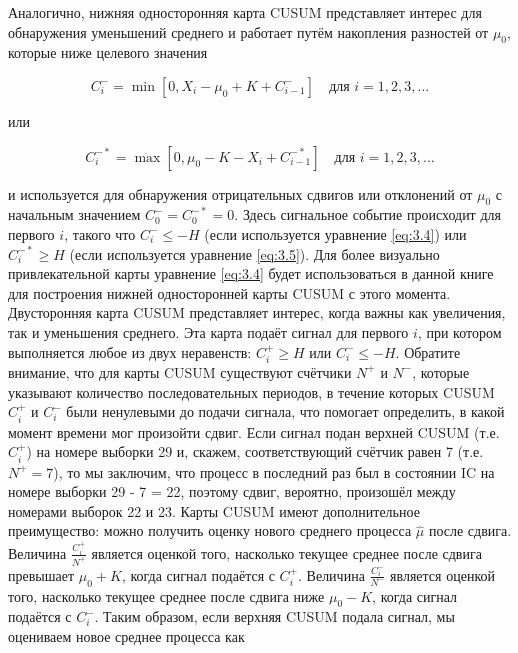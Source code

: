 Аналогично, нижняя односторонняя карта CUSUM представляет интерес для обнаружения уменьшений среднего и работает путём накопления разностей от \(\mu_0\), которые ниже целевого значения

\begin{equation}
	C_i^{-} = \min[0, X_i - \mu_0 + K + C_{i-1}^{-}] \quad \text{для } i = 1, 2, 3, \ldots
	\label{eq:3.4}
\end{equation}

или

\begin{equation}
	C_i^{-*} = \max[0, \mu_0 - K - X_i + C_{i-1}^{-*}] \quad \text{для } i = 1, 2, 3, \ldots
	\label{eq:3.5}
\end{equation}

и используется для обнаружения отрицательных сдвигов или отклонений от \(\mu_0\) с начальным значением \(C_0^- = C_0^{-*} = 0\). Здесь сигнальное событие происходит для первого \(i\), такого что \(C_i^- \leq -H\) (если используется уравнение \eqref{eq:3.4}) или \(C_i^{-*} \geq H\) (если используется уравнение \eqref{eq:3.5}). Для более визуально привлекательной карты уравнение \eqref{eq:3.4} будет использоваться в данной книге для построения нижней односторонней карты CUSUM с этого момента. Двусторонняя карта CUSUM представляет интерес, когда важны как увеличения, так и уменьшения среднего. Эта карта подаёт сигнал для первого \(i\), при котором выполняется любое из двух неравенств: \(C_i^+ \geq H\) или \(C_i^- \leq -H\). Обратите внимание, что для карты CUSUM существуют счётчики \(N^+\) и \(N^-\), которые указывают количество последовательных периодов, в течение которых CUSUM \(C_i^+\) и \(C_i^-\) были ненулевыми до подачи сигнала, что помогает определить, в какой момент времени мог произойти сдвиг. Если сигнал подан верхней CUSUM (т.е. \(C_i^+\)) на номере выборки 29 и, скажем, соответствующий счётчик равен 7 (т.е. \(N^+ = 7\)), то мы заключим, что процесс в последний раз был в состоянии IC на номере выборки 29 - 7 = 22, поэтому сдвиг, вероятно, произошёл между номерами выборок 22 и 23. Карты CUSUM имеют дополнительное преимущество: можно получить оценку нового среднего процесса \(\hat{\mu}\) после сдвига. Величина \(\frac{C_i^+}{N^+}\) является оценкой того, насколько текущее среднее после сдвига превышает \(\mu_0 + K\), когда сигнал подаётся с \(C_i^+\). Величина \(\frac{C_i^-}{N^-}\) является оценкой того, насколько текущее среднее после сдвига ниже \(\mu_0 - K\), когда сигнал подаётся с \(C_i^-\). Таким образом, если верхняя CUSUM подала сигнал, мы оцениваем новое среднее процесса как

